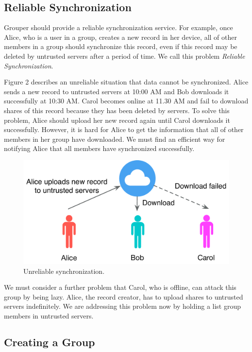 \documentclass[twocolumn,10pt]{article}
\begin{document}
\subsection{Reliable Synchronization}
Grouper should provide a reliable synchronization service. For example, once Alice, who is a user in a group, creates a new record in her device, all of other members in a group should synchronize this record, even if this record may be deleted by untrusted servers after a period of time. We call this problem \emph{Reliable Synchronization}.

Figure 2 describes an unreliable situation that data cannot be synchronized. Alice sends a new record to untrusted servers at 10:00 AM and Bob downloads it successfully at 10:30 AM. Carol becomes online at 11.30 AM and fail to download shares of this record because they has been deleted by servers. To solve this problem, Alice should upload her new record again until Carol downloads it successfully. However, it is hard for Alice to get the information that all of other members in her group have downloaded. We must find an efficient way for notifying Alice that all members have synchronized successfully.

\begin{figure}[t]
	\centering
	\includegraphics[scale=0.38]{unreliabe_sync}
	\caption{Unreliable synchronization.}
\end{figure}

We must consider a further problem that Carol, who is offline, can attack this group by being lazy. Alice, the record creator, has to upload shares to untrusted servers indefinitely. We are addressing this problem now by holding a list group members in untrusted servers.

\subsection{Creating a Group}
\end{document}
